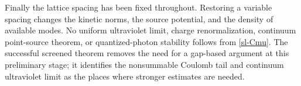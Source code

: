 Finally the lattice spacing has been fixed throughout. Restoring a
variable spacing changes the kinetic norms, the source potential, and
the density of available modes. No uniform ultraviolet limit, charge
renormalization, continuum point-source theorem, or quantized-photon
stability follows from \eqref{sl-Cmu}. The successful screened theorem
removes the need for a gap-based argument at this preliminary stage;
it identifies the nonsummable Coulomb tail and continuum ultraviolet
limit as the places where stronger estimates are needed.
